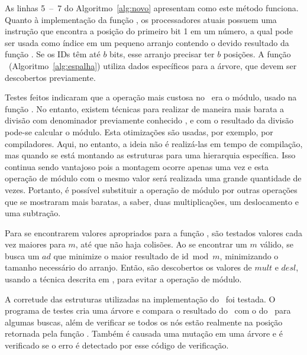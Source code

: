 As linhas 5~--~7 do Algoritmo~\ref{alg:novo} apresentam como este método funciona.
Quanto à implementação da função \bpn, os processadores atuais possuem uma instrução que encontra a posição do primeiro bit 1 em um número, a qual pode ser usada como índice em um pequeno arranjo contendo o devido resultado da função \bpn.
Se os IDs têm até $b$ bits, esse arranjo precisar ter $b$ posições.
A função \Espalha\ (Algoritmo~\ref{alg:espalha}) utiliza dados específicos para a árvore, que devem ser descobertos previamente.

Testes feitos indicaram que a operação mais custosa no \Novo\ era o módulo, usado na função \Espalha.
No entanto, existem técnicas para realizar de maneira mais barata a divisão com denominador previamente conhecido \cite{reciproco}, e com o resultado da divisão pode-se calcular o módulo.
Esta otimizações são usadas, por exemplo, por compiladores.
Aqui, no entanto, a ideia não é realizá-las em tempo de compilação, mas quando se está montando as estruturas para uma hierarquia específica.
Isso continua sendo vantajoso pois a montagem ocorre apenas uma vez e esta operação de módulo com o mesmo valor será realizada uma grande quantidade de vezes.
Portanto, é possível substituir a operação de módulo por outras operações que se mostraram mais baratas, a saber, duas multiplicações, um deslocamento e uma subtração.

Para se encontrarem valores apropriados para a função \Espalha, são testados valores cada vez maiores para $m$, até que não haja colisões.
Ao se encontrar um $m$ válido, se busca um $\mathit{ad}$ que minimize o maior resultado de $\mathrm{id} \bmod m$, minimizando o tamanho necessário do arranjo.
Então, são descobertos os valores de $\mathit{mult}$ e $\mathit{desl}$, usando a técnica descrita em , para evitar a operação de módulo.

A corretude das estruturas utilizadas na implementação do \Novo\ foi testada.
O programa de testes cria uma árvore e compara o resultado do \Simples\ com o do \Novo\ para algumas buscas, além de verificar se todos os nós estão realmente na posição retornada pela função \Espalha.
Também é causada uma mutação em uma árvore e é verificado se o erro é detectado por esse código de verificação.







